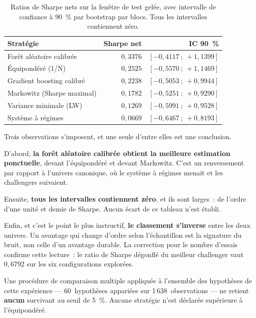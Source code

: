 \begin{table}[htbp]
  \centering
  \caption[Panel marocain profond : test gelé]{Ratios de Sharpe nets sur la
  fenêtre de test gelée, avec intervalle de confiance à 90~\% par bootstrap
  par blocs. Tous les intervalles contiennent zéro.}
  \label{tab:maroc-sharpe}
  \small
  \begin{tabular}{lrr}
    \toprule
    Stratégie & Sharpe net & IC 90~\% \\
    \midrule
    Forêt aléatoire calibrée   & $0{,}3376$ & $[-0{,}4117~;~+1{,}1399]$ \\
    Équipondéré (1/N)          & $0{,}2525$ & $[-0{,}5570~;~+1{,}1469]$ \\
    Gradient boosting calibré  & $0{,}2238$ & $[-0{,}5053~;~+0{,}9944]$ \\
    Markowitz (Sharpe maximal) & $0{,}1782$ & $[-0{,}5251~;~+0{,}9290]$ \\
    Variance minimale (LW)     & $0{,}1269$ & $[-0{,}5991~;~+0{,}9528]$ \\
    Système à régimes          & $0{,}0669$ & $[-0{,}6467~;~+0{,}8193]$ \\
    \bottomrule
  \end{tabular}
\end{table}

Trois observations s'imposent, et une seule d'entre elles est une conclusion.

D'abord, \textbf{la forêt aléatoire calibrée obtient la meilleure estimation
ponctuelle}, devant l'équipondéré et devant Markowitz. C'est un renversement par
rapport à l'univers canonique, où le système à régimes menait et les challengers
suivaient.

Ensuite, \textbf{tous les intervalles contiennent zéro}, et ils sont larges~: de
l'ordre d'une unité et demie de Sharpe. Aucun écart de ce tableau n'est
établi.

Enfin, et c'est le point le plus instructif, \textbf{le classement s'inverse}
entre les deux univers. Un avantage qui change d'ordre selon l'échantillon est
la signature du bruit, non celle d'un avantage durable. La correction pour le
nombre d'essais confirme cette lecture~: le ratio de Sharpe dégonflé du meilleur
challenger vaut $0{,}6792$ sur les six configurations explorées.

Une procédure de comparaison multiple appliquée à l'ensemble des hypothèses de
cette expérience — 60~hypothèses appariées sur 1\,638~observations — ne retient
\textbf{aucun} survivant au seuil de 5~\%. Aucune stratégie n'est déclarée
supérieure à l'équipondéré.

